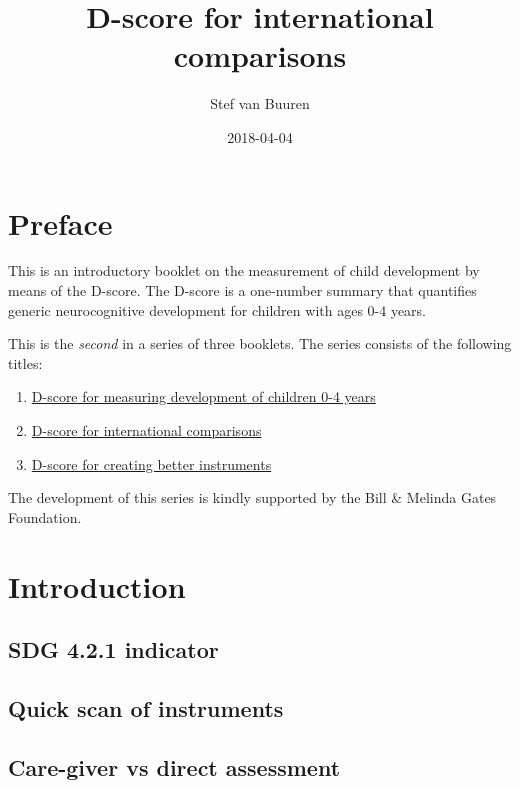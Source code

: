 \documentclass[]{book}
\title{D-score for international comparisons}
\author{Stef van Buuren}
\date{2018-04-04}
\providecommand{\tightlist}{%
  \setlength{\itemsep}{0pt}\setlength{\parskip}{0pt}}
\theoremstyle{definition}
\theoremstyle{definition}
\theoremstyle{definition}
\theoremstyle{remark}
\begin{document}
\maketitle

{
\setcounter{tocdepth}{1}
\tableofcontents
}
\chapter*{Preface}\label{preface}

This is an introductory booklet on the measurement of child development
by means of the D-score. The D-score is a one-number summary that
quantifies generic neurocognitive development for children with ages 0-4
years.

This is the \emph{second} in a series of three booklets. The series
consists of the following titles:

\begin{enumerate}
\def\labelenumi{\arabic{enumi}.}
\tightlist
\item
  \href{https://stefvanbuuren.github.io/dbook1/}{D-score for measuring
  development of children 0-4 years}
\item
  \href{https://stefvanbuuren.github.io/dbook2/}{D-score for
  international comparisons}
\item
  \href{https://stefvanbuuren.github.io/dbook3/}{D-score for creating
  better instruments}
\end{enumerate}

The development of this series is kindly supported by the Bill \&
Melinda Gates Foundation.

\chapter{Introduction}\label{ch:introduction2}

\section{SDG 4.2.1 indicator}\label{sdg-4.2.1-indicator}

\section{Quick scan of instruments}\label{quick-scan-of-instruments}

\section{Care-giver vs direct
assessment}\label{care-giver-vs-direct-assessment}
\end{document}
